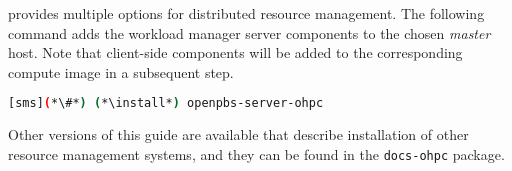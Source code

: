 \OHPC{} provides multiple options for distributed resource management. The 
following command adds the \rms{} workload manager server components to the
chosen {\em master} host. Note that client-side components will be added to
the corresponding compute image in a subsequent step.

\begin{lstlisting}[language=bash,keywords={}]
[sms](*\#*) (*\install*) openpbs-server-ohpc
\end{lstlisting}

Other versions of this guide are available that describe installation of other
resource management systems, and they can be found in the \texttt{docs-ohpc}
package.
